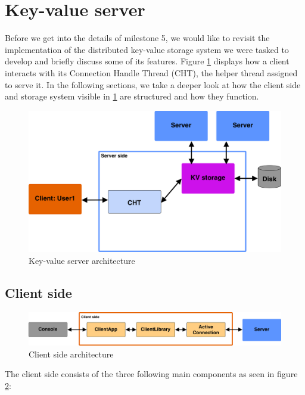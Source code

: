 \section{Key-value server}
 Before we get into the details of milestone 5, we would like to revisit the implementation of the distributed key-value storage system we were tasked to develop and briefly discuss some of its features. Figure \ref{fig:ms4_arch} displays how a client interacts with its Connection Handle Thread (CHT), the helper thread assigned to serve it. In the following sections, we take a deeper look at how the client side and storage system visible in \ref{fig:ms4_arch} are structured and how they function.

\begin{figure}[h]
	\centering
	\includegraphics[width=\linewidth]{figures/kvserver/ms4_structure.png}
	\caption{Key-value server architecture}
	\label{fig:ms4_arch}
\end{figure}



\subsection{Client side}

\begin{figure}[h]
	\centering
	\includegraphics[width=\linewidth]{figures/kvserver/client_arch.png}
	\caption{Client side architecture}
	\label{fig:client_arch}
\end{figure}

The client side consists of the three following main components as seen in figure \ref{fig:client_arch}:

